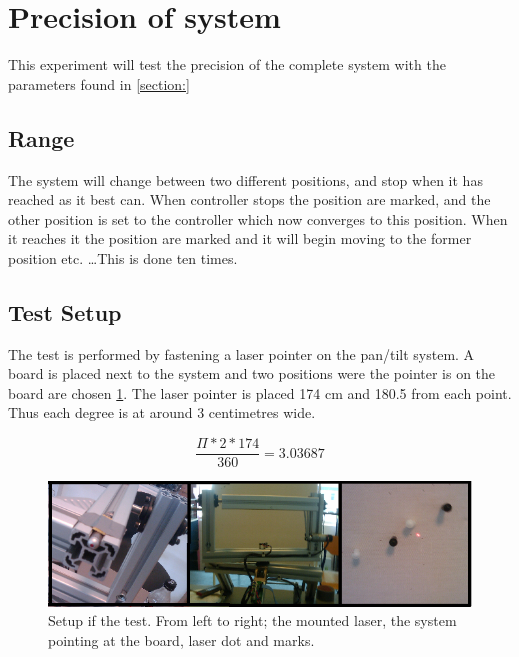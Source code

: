 \section{Precision of system}\label{sec:precisionofsystem}

This experiment will test the precision of the complete system with the parameters found in \ref{section:}

\subsection{Range}

The system will change between two different positions, and stop when it has reached as it best can. When controller stops the position are marked, and the other position is set to the controller which now converges to this position. When it reaches it the position are marked and it will begin moving to the former position etc. \dots This is done ten times.

\subsection{Test Setup}\label{subsec:testsetup}

The test is performed by fastening a laser pointer on the pan/tilt system. A board is placed next to the system and two positions were the pointer is on the board are chosen \ref{fig:systemtestsetup}. The laser pointer is placed 174 cm and 180.5 from each point. Thus each degree is at around 3 centimetres wide.

\[ \frac{\Pi*2*174}{360} = 3.03687 \]


\begin{figure}[htb]
	\centering
	\includegraphics[width=\textwidth,trim=0 0 0 0]{graphics/overallsystemtest.png} %
	\caption{Setup if the test. From left to right; the mounted laser, the system pointing at the board, laser dot and marks.}
	\label{fig:systemtestsetup}			%
\end{figure}


